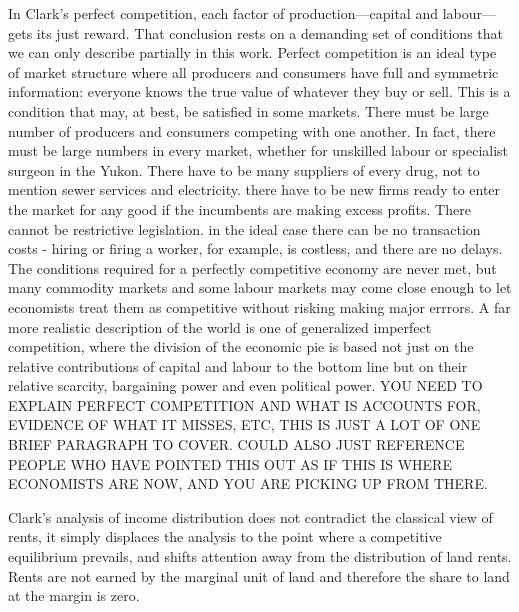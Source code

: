  In Clark's  perfect competition, %
 each factor of production—capital and labour—gets its just reward. That conclusion rests on a demanding set of conditions that we can only describe partially in this work. Perfect competition is an ideal type of market structure where all producers and consumers have full and symmetric information: everyone knows the true value of whatever they buy or sell.  This is a condition that may, at best, be satisfied in some markets. There must be large number of producers and consumers competing with one another. In fact, there must be large numbers in every market, whether for unskilled labour or specialist surgeon in the Yukon.  There have to be many suppliers of every drug, not to mention sewer services and electricity. there have to be new firms ready to enter the market  for any good  if the incumbents are making excess profits. There cannot be restrictive legislation. in the ideal case there can be no transaction costs - hiring or firing a worker, for example,  is costless,  and there are no delays. The conditions required for a perfectly competitive economy are never met, but many commodity markets and some labour markets may come close enough to let economists treat them as competitive without risking making major errrors. 
 A far more realistic description of the world is one of generalized  \gls{imperfect competition}, where the division of the economic pie is based not just on the relative contributions of capital and labour to the bottom line but on their relative scarcity, bargaining power and even political power.  %
 YOU NEED TO EXPLAIN PERFECT COMPETITION AND WHAT IS ACCOUNTS FOR, EVIDENCE OF WHAT IT MISSES, ETC, THIS IS JUST A LOT OF ONE BRIEF PARAGRAPH TO COVER. COULD ALSO JUST REFERENCE PEOPLE WHO HAVE POINTED THIS OUT AS IF THIS IS WHERE ECONOMISTS ARE NOW, AND YOU ARE PICKING UP FROM THERE. 
 
Clark's analysis of income distribution does not contradict the classical view of rents, it simply displaces the analysis to the point where a competitive equilibrium prevails, and shifts attention away from the distribution of land rents. Rents are not earned by the marginal unit of land and therefore the share to land at the margin is zero. 


